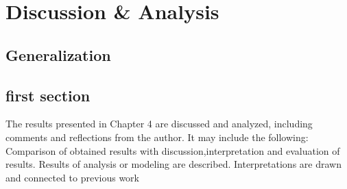 \chapter{Discussion \& Analysis} \label{ch:discussion}

\section{Generalization}
\section{first section}

The results presented in Chapter 4 are discussed and analyzed, including comments and reflections from the author. It may include the following: Comparison of obtained results with discussion,interpretation and evaluation of results. Results of analysis or modeling are described. Interpretations are drawn and connected to previous work